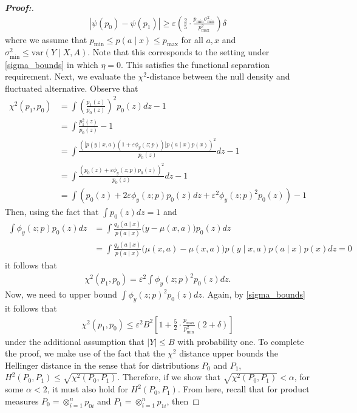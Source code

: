 \documentclass[11pt,twoside]{article}
\newcommand{\var}{\text{var}}
\theoremstyle{definition}
\theoremstyle{remark}
\begin{document}
\begin{proof}[\textbf{Proof:}]
\begin{align*}
   |\psi(p_0) - \psi(p_1)| \geq \varepsilon  \left( \frac{2}{5} \cdot \frac{p_{\min} \sigma^2_{\min}}{p^2_{\max}} \right) \delta 
\end{align*}
where we assume that $p_{\min} \leq p(a \mid x) \leq p_{\max}$ for all $a,x$ and $\sigma^2_{\min} \leq \var(Y \mid X, A)$. Note that this corresponds to the setting under \cref{sigma_bounds} in which $\eta = 0$. This satisfies the functional separation requirement. Next, we evaluate the $\chi^2$-distance between the null density and fluctuated alternative. Observe that
\begin{align*}
    \chi^2(p_1, p_0) &= \int \left( \frac{p_1(z)}{p_0(z)} \right)^2 p_0(z)dz - 1 \\
    &= \int  \frac{p^2_1(z)}{p_0(z)}  - 1 \\
    &= \int  \frac{\left(\big[p(y \mid x, a)(1 + \varepsilon \phi_y(z; p)) \big]p(a \mid x) p(x)\right)^2}{p_0(z)}dz  - 1 \\
    &= \int  \frac{\left(p_0(z) + \varepsilon \phi_y(z; p) p_0(z)\right)^2}{p_0(z)} dz  - 1 \\
    &= \int  \left(p_0(z) + 2\varepsilon \phi_y(z; p) p_0(z) dz + \varepsilon^2 \phi_y(z; p)^2 p_0(z)\right)  - 1
\end{align*}
Then, using the fact that $\int p_0(z) dz = 1$ and
\begin{align*}
    \int \phi_y(z; p) p_0(z) dz &= \int \frac{q_\delta(a \mid x)}{p(a \mid x)}\Big(y - \mu(x, a)\Big) p_0(z) dz \\
    &= \int \frac{q_\delta(a \mid x)}{p(a \mid x)}\Big(\mu(x, a) - \mu(x, a)\Big) p(y \mid x, a) p(a \mid x) p(x) dz = 0
\end{align*}
it follows that
\begin{align*}
    \chi^2(p_1, p_0) = \varepsilon^2 \int \phi_y(z; p)^2 p_0(z) dz.
\end{align*}
Now, we need to upper bound $\int \phi_y(z; p)^2 p_0(z) dz$. Again, by \cref{sigma_bounds} it follows that
\begin{align*}
    \chi^2(p_1, p_0) \leq \varepsilon^2 B^2 \left[1 + \frac{5}{2} \cdot \frac{p_{\max}}{p^2_{\min}} \left(2 + \delta \right) \right]
\end{align*}
under the additional assumption that $|Y|\leq B$ with probability one. To complete the proof, we make use of the fact that the $\chi^2$ distance upper bounds the Hellinger distance in the sense that for distributions $P_0$ and $P_1$, $H^2(P_0, P_1) \leq \sqrt{\chi^2(P_0, P_1)}$. Therefore, if we show that $\sqrt{\chi^2(P_0, P_1)} < \alpha$, for some $\alpha < 2$, it must also hold for $H^2(P_0, P_1)$. From here, recall that for product measures $P_0 = \otimes^n_{i=1} p_{0i}$ and $P_1 = \otimes^n_{i=1} p_{1i}$, then

\end{proof}
\end{document}
